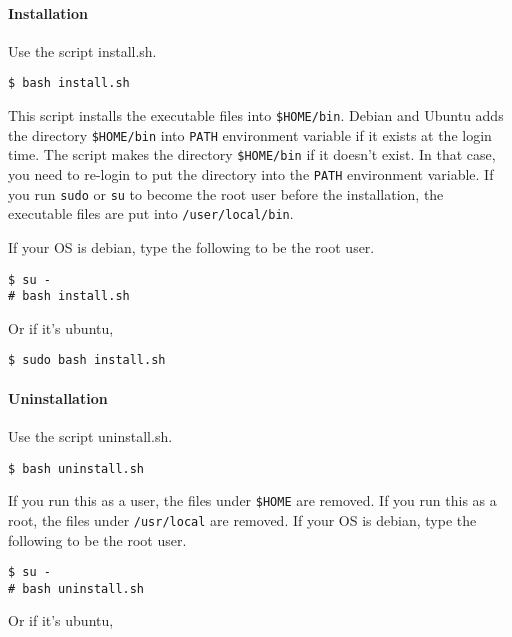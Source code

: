 \hypertarget{installation}{%
\paragraph{Installation}\label{installation}}

Use the script install.sh.

\begin{verbatim}
$ bash install.sh
\end{verbatim}

This script installs the executable files into \texttt{\$HOME/bin}.
Debian and Ubuntu adds the directory \texttt{\$HOME/bin} into
\texttt{PATH} environment variable if it exists at the login time. The
script makes the directory \texttt{\$HOME/bin} if it doesn't exist. In
that case, you need to re-login to put the directory into the
\texttt{PATH} environment variable. If you run \texttt{sudo} or
\texttt{su} to become the root user before the installation, the
executable files are put into \texttt{/user/local/bin}.

If your OS is debian, type the following to be the root user.

\begin{verbatim}
$ su -
# bash install.sh
\end{verbatim}

Or if it's ubuntu,

\begin{verbatim}
$ sudo bash install.sh
\end{verbatim}

\hypertarget{uninstallation}{%
\paragraph{Uninstallation}\label{uninstallation}}

Use the script uninstall.sh.

\begin{verbatim}
$ bash uninstall.sh
\end{verbatim}

If you run this as a user, the files under \texttt{\$HOME} are removed.
If you run this as a root, the files under \texttt{/usr/local} are
removed. If your OS is debian, type the following to be the root user.

\begin{verbatim}
$ su -
# bash uninstall.sh
\end{verbatim}

Or if it's ubuntu,

